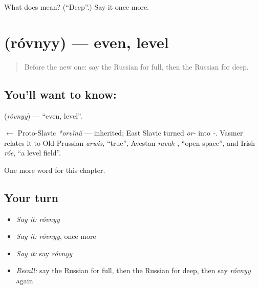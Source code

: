 \begin{tcolorbox}[breakable,colback=teal!4,colframe=teal!35!black,title={Before you move on}]
What does  mean? (\textquotedblleft{}Deep\textquotedblright{}.) Say it once more.
\end{tcolorbox}
\section[\texorpdfstring{\ru{ровный} (róvnyy)}{ровный (róvnyy)}]{ (róvnyy) — even, level}

\label{lesson:RU-C187-rovnyy}



\begin{quote}
Before the new one: say the Russian for full, then the Russian for deep.
\end{quote}

\subsection*{You'll want to know: }
\textbf{} (\emph{róvnyy}) — \textquotedblleft{}even, level\textquotedblright{}.

\begin{cousinweb}
\textbf{} $\leftarrow$ Proto-Slavic \emph{*orvĭnŭ} — inherited; East Slavic turned \emph{or-} into \emph{-}. Vasmer relates it to Old Prussian \emph{arwis}, \textquotedblleft{}true\textquotedblright{}, Avestan \emph{ravah-}, \textquotedblleft{}open space\textquotedblright{}, and Irish \emph{róe}, \textquotedblleft{}a level field\textquotedblright{}.
\end{cousinweb}

\begin{grammarlens}[title={What you've built}]
One more word for this chapter.
\end{grammarlens}

\subsection*{Your turn}
\begin{itemize}
\raggedright
  \item \emph{Say it:} \emph{róvnyy}
  \item \emph{Say it:} \emph{róvnyy}, once more
  \item \emph{Say it:} say \emph{róvnyy}
  \item \emph{Recall:} say the Russian for full, then the Russian for deep, then say \emph{róvnyy} again
\end{itemize}

